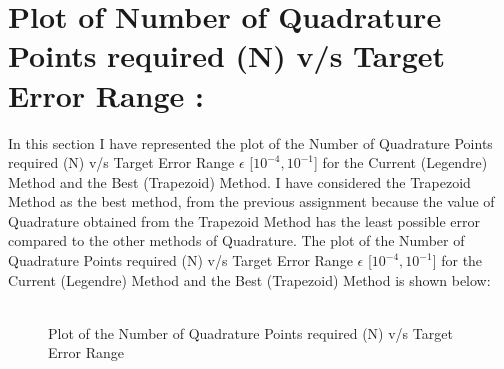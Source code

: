 \documentclass[12pt,a4paper]{article}
\begin{document}
\section{Plot of Number of Quadrature Points required (N) v/s Target Error Range :}
In this section I have represented the plot of the Number of Quadrature Points required (N) v/s Target Error Range $\epsilon$ [$10^{-4}, 10^{-1}$] for the Current (Legendre) Method and the Best (Trapezoid) Method. I have considered the Trapezoid Method as the best method, from the previous assignment because the value of Quadrature obtained from the Trapezoid Method has the least possible error compared to the other methods of Quadrature. The plot of the Number of Quadrature Points required (N) v/s Target Error Range $\epsilon$ [$10^{-4}, 10^{-1}$] for the Current (Legendre) Method and the Best (Trapezoid) Method is shown below:
\\ \\
\begin{figure}[!ht]
	\begin{center}
	\end{center}
	\caption{Plot of the Number of Quadrature Points required (N) v/s Target Error Range}
\end{figure}
\clearpage
\end{document}
